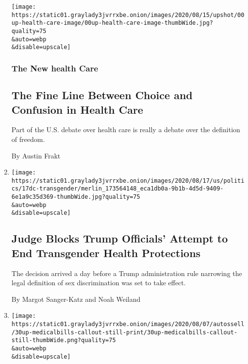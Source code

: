 \begin{enumerate}
  \texttt{[image: https://static01.graylady3jvrrxbe.onion/images/2020/08/15/upshot/00up-health-care-image/00up-health-care-image-thumbWide.jpg?quality=75\\\&auto=webp\\\&disable=upscale]}

  \hypertarget{the-new-health-care}{%
  \subsubsection{The New health Care}\label{the-new-health-care}}

  \hypertarget{the-fine-line-between-choice-and-confusion-in-health-care}{%
  \subsection{The Fine Line Between Choice and Confusion in Health
  Care}\label{the-fine-line-between-choice-and-confusion-in-health-care}}

  Part of the U.S. debate over health care is really a debate over the
  definition of freedom.

  By Austin Frakt
\item
  \href{/2020/08/17/us/politics/trump-court-transgender-rights.html}{}

  \texttt{[image: https://static01.graylady3jvrrxbe.onion/images/2020/08/17/us/politics/17dc-transgender/merlin\_173564148\_eca1db0a-9b1b-4d5d-9409-6e1a9c35d369-thumbWide.jpg?quality=75\\\&auto=webp\\\&disable=upscale]}

  \hypertarget{judge-blocks-trump-officials-attempt-to-end-transgender-health-protections}{%
  \subsection{Judge Blocks Trump Officials' Attempt to End Transgender
  Health
  Protections}\label{judge-blocks-trump-officials-attempt-to-end-transgender-health-protections}}

  The decision arrived a day before a Trump administration rule
  narrowing the legal definition of sex discrimination was set to take
  effect.

  By Margot Sanger-Katz and Noah Weiland
\item
  \href{/2020/08/07/insider/coronavirus-medical-bills.html}{}

  \texttt{[image: https://static01.graylady3jvrrxbe.onion/images/2020/08/07/autossell/30up-medicalbills-callout-still-print/30up-medicalbills-callout-still-thumbWide.png?quality=75\\\&auto=webp\\\&disable=upscale]}


\end{enumerate}
